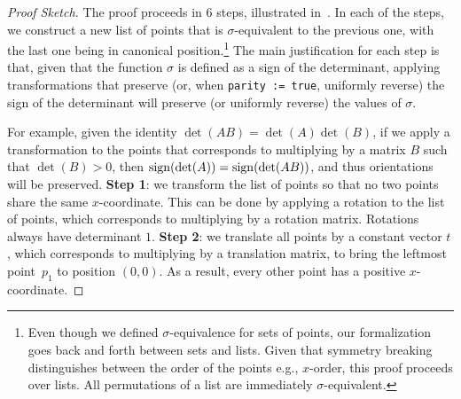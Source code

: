\begin{proof}[Proof Sketch]
The proof proceeds in 6 steps, illustrated in~.
In each of the steps, we construct a new list of points that is $\sigma$-equivalent to the previous one,
with the last one being in canonical position.\footnote{
Even though we defined $\sigma$-equivalence for sets of points,
our formalization goes back and forth between sets and lists.
Given that symmetry breaking distinguishes between the order of the points
e.g., $x$-order, this proof proceeds over lists.
All permutations of a list are immediately $\sigma$-equivalent.}
The main justification for each step is that,
given that the function $\sigma$ is defined as a sign of the determinant,
applying transformations that preserve (or, when \lstinline|parity := true|, uniformly reverse)
the sign of the determinant will preserve (or uniformly reverse) the values of $\sigma$.

For example, given the identity $\det(AB) = \det(A)\det(B)$,
if we apply a transformation to the points that corresponds to multiplying by a matrix $B$ such that $\det(B) > 0$,
then $\operatorname{sign}(\det(A)) = \operatorname{sign}(\det(AB))$, and thus orientations will be preserved.
\textbf{Step 1}: we transform the list of points so that no two points share the same $x$-coordinate.
This can be done by applying a rotation to the list of points, which corresponds to multiplying by a rotation matrix.
Rotations always have determinant $1$.
\textbf{Step 2}: we translate all points by a constant vector $t$, which corresponds to multiplying by a translation matrix,
to bring the leftmost point~$p_1$ to position $(0, 0)$.
As a result, every other point has a positive $x$-coordinate.


\end{proof}
